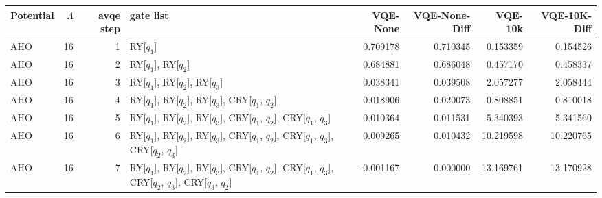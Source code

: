 \begin{tabular}{lrrlrrrr}
\toprule
Potential & $\Lambda$ & avqe step & gate list & VQE-None & VQE-None-Diff & VQE-10k & VQE-10K-Diff \\
\midrule
AHO & 16 & 1 & RY[$q_1$] & 0.709178 & 0.710345 & 0.153359 & 0.154526 \\
AHO & 16 & 2 & RY[$q_1$], RY[$q_2$] & 0.684881 & 0.686048 & 0.457170 & 0.458337 \\
AHO & 16 & 3 & RY[$q_1$], RY[$q_2$], RY[$q_3$] & 0.038341 & 0.039508 & 2.057277 & 2.058444 \\
AHO & 16 & 4 & RY[$q_1$], RY[$q_2$], RY[$q_3$], CRY[$q_1$, $q_2$] & 0.018906 & 0.020073 & 0.808851 & 0.810018 \\
AHO & 16 & 5 & RY[$q_1$], RY[$q_2$], RY[$q_3$], CRY[$q_1$, $q_2$], CRY[$q_1$, $q_3$] & 0.010364 & 0.011531 & 5.340393 & 5.341560 \\
AHO & 16 & 6 & RY[$q_1$], RY[$q_2$], RY[$q_3$], CRY[$q_1$, $q_2$], CRY[$q_1$, $q_3$], CRY[$q_2$, $q_3$] & 0.009265 & 0.010432 & 10.219598 & 10.220765 \\
AHO & 16 & 7 & RY[$q_1$], RY[$q_2$], RY[$q_3$], CRY[$q_1$, $q_2$], CRY[$q_1$, $q_3$], CRY[$q_2$, $q_3$], CRY[$q_3$, $q_2$] & -0.001167 & 0.000000 & 13.169761 & 13.170928 \\
\bottomrule
\end{tabular}
